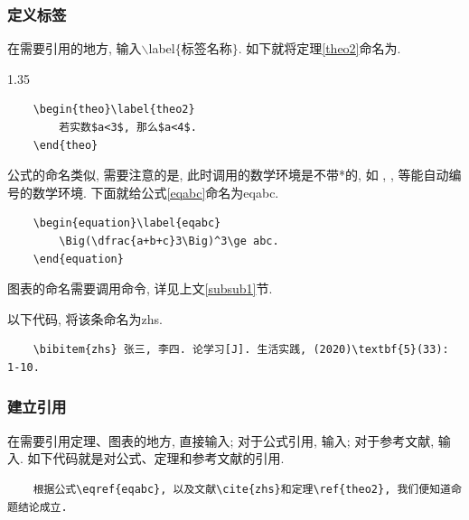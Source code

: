 \documentclass[a4paper,12pt,twoside]{ctexart}
\begin{document}
    \subsubsection{定义标签}
    在需要引用的地方, 输入$\backslash$label$\{$标签名称$\}$. 如下就将定理\ref{theo2}命名为.\\[-20pt]
    \begin{spacing}{1.35}
    \begin{verbatim}
    \begin{theo}\label{theo2}
        若实数$a<3$, 那么$a<4$.
    \end{theo}
    \end{verbatim}
    \end{spacing}\noindent

    公式的命名类似, 需要注意的是, 此时调用的数学环境是不带*的, 如 , , 等能自动编号的数学环境. 下面就给公式\ref{eqabc}命名为eqabc.\\[-20pt]

    \begin{verbatim}
    \begin{equation}\label{eqabc}
        \Big(\dfrac{a+b+c}3\Big)^3\ge abc.
    \end{equation}
    \end{verbatim}

    \noindent
{}

    图表的命名需要调用命令, 详见上文\ref{subsub1}节.

    以下代码, 将该条命名为zhs.
    \begin{verbatim}
    \bibitem{zhs} 张三, 李四. 论学习[J]. 生活实践, (2020)\textbf{5}(33): 1-10.
    \end{verbatim}

    \subsubsection{建立引用}
    在需要引用定理、图表的地方, 直接输入; 对于公式引用, 输入; 对于参考文献, 输入. 如下代码就是对公式、定理和参考文献的引用.     \begin{verbatim}
    根据公式\eqref{eqabc}, 以及文献\cite{zhs}和定理\ref{theo2}, 我们便知道命题结论成立.
    \end{verbatim}
\end{document}
